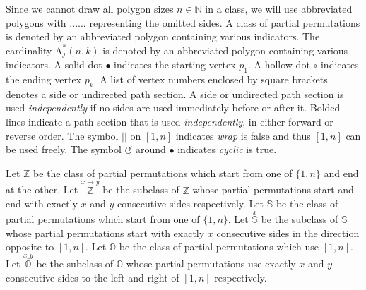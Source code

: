\documentclass[a4paper, 12pt] {article}
\theoremstyle{remark}
\theoremstyle{plain}
\theoremstyle{remark}
\begin{document}
Since we cannot draw all polygon sizes $n \in \mathbb{N}$ in a class, we will use abbreviated polygons with $......$ representing the omitted sides.
A class of partial permutations is denoted by an abbreviated polygon containing various indicators.
The cardinality $\textrm{A}_{j}^{*}(n, k)$ is denoted by an abbreviated polygon containing various indicators.
A solid dot $\bullet$ indicates the starting vertex $p_1$.
A hollow dot $\circ$ indicates the ending vertex $p_k$.
A list of vertex numbers enclosed by square brackets denotes a side or undirected path section.
A side or undirected path section is used \textit{independently} if no sides are used immediately before or after it.
Bolded lines indicate a path section that is used \textit{independently}, in either forward or reverse order.
The symbol $||$ on $[1, n]$ indicates \textit{wrap} is false and thus $[1, n]$ can be used freely.
The symbol $\circlearrowleft$ around $\bullet$ indicates \textit{cyclic} is true.
\begin{comment}
The symbol $\times$ on a side indicates it cannot be used.
The symbol $||$ on $[1, n]$ indicates \textit{wrap} is false and thus $[1, n]$ can be used freely since it does not increase (\textit{cyclic-})\textit{consecutivity}.
The symbol $\circlearrowleft$ around $\bullet$ indicates \textit{cyclic} is true and thus (\textit{wrap-})\textit{cyclic-consecutivity} may increase if $\bullet$ and $\circ$ are on adjacent vertices.
\end{comment}
\begin{comment}
A side is used \textit{independently} if neither of its two adjacent sides are also used.
A path section is used \textit{independently} if no sides are used immediately before or after it.
\end{comment}

Let $\mathbb{Z}$ be the class of partial permutations which start from one of $\{1, n\}$ and end at the other.
Let $\stackrel{x \rightarrow y}{\mathbb{Z}}$ be the subclass of $\mathbb{Z}$ whose partial permutations start and end with exactly $x$ and $y$ consecutive sides respectively.
Let $\mathbb{S}$ be the class of partial permutations which start from one of $\{1, n\}$.
Let $\stackrel{x}{\mathbb{S}}$ be the subclass of $\mathbb{S}$ whose partial permutations start with exactly $x$ consecutive sides in the direction opposite to $[1, n]$.
Let $\mathbb{O}$ be the class of partial permutations which use $[1, n]$.
Let $\stackrel{x \_ y}{\mathbb{O}}$ be the subclass of $\mathbb{O}$ whose partial permutations use exactly $x$ and $y$ consecutive sides to the left and right of $[1, n]$ respectively.
\end{document}
